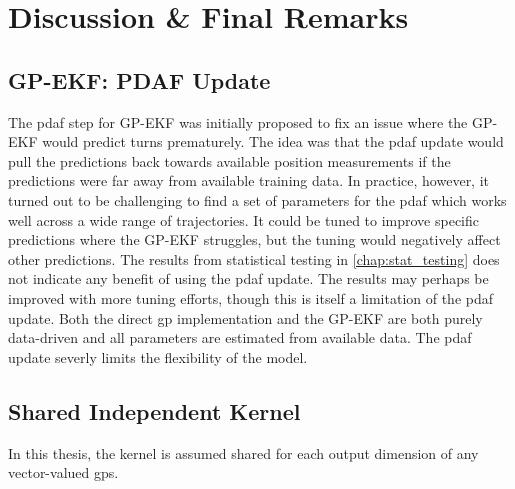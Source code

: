 \chapter{Discussion \& Final Remarks}\label{chap:discussion}

\section{GP-EKF: PDAF Update}
The \acrshort{pdaf} step for GP-EKF was initially proposed to fix an issue where the GP-EKF would predict turns prematurely. The idea was that the \acrshort{pdaf} update would pull the predictions back towards available position measurements if the predictions were far away from available training data. In practice, however, it turned out to be challenging to find a set of parameters for the \acrshort{pdaf} which works well across a wide range of trajectories. It could be tuned to improve specific predictions where the GP-EKF struggles, but the tuning would negatively affect other predictions. The results from statistical testing in \cref{chap:stat_testing} does not indicate any benefit of using the \acrshort{pdaf} update. The results may perhaps be improved with more tuning efforts, though this is itself a limitation of the \acrshort{pdaf} update. Both the direct \acrshort{gp} implementation and the GP-EKF are both purely data-driven and all parameters are estimated from available data. The \acrshort{pdaf} update severly limits the flexibility of the model. 

\section{Shared Independent Kernel}
In this thesis, the kernel is assumed shared for each output dimension of any vector-valued \acrshort{gp}s. 